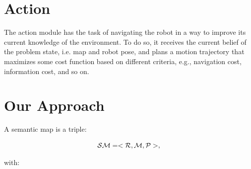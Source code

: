 \documentclass{article}
\begin{document}
	\section{Action}
	
	The action module has the task of navigating the robot in a way to improve its current knowledge of the environment. To do so, it receives the current belief of the problem state, i.e. map and robot pose, and plans a motion trajectory that maximizes some cost function based on different criteria, e.g., navigation cost, information cost, and so on.
	
	\clearpage
	
	
	
	\clearpage

	\section{Our Approach}
	
	A semantic map is a triple:
	
	\begin{equation}
	\mathcal{SM} = < \mathcal{R}, \mathcal{M}, \mathcal{P} >,
	\end{equation}
	
	\noindent
	with:
		
\end{document}
